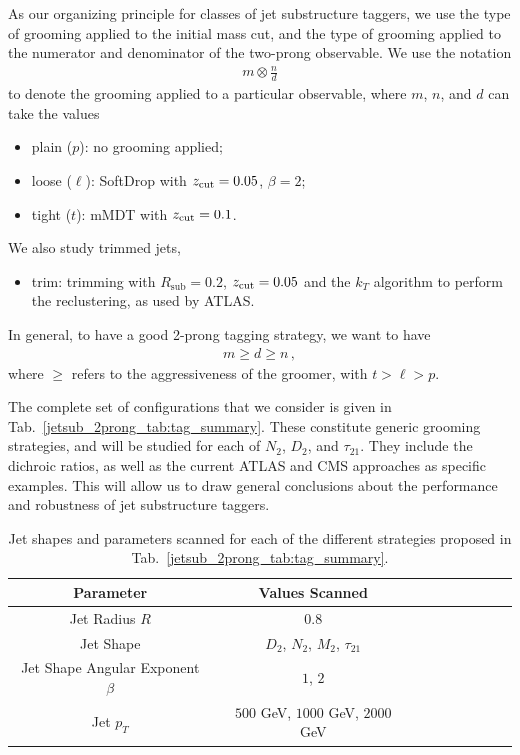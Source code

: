 \documentclass[11pt,letterpaper]{article}
\begin{document}
As our organizing principle for classes of  jet substructure taggers, we use the type of grooming applied to the initial mass cut, and the type of grooming applied to the numerator and denominator of the two-prong observable.
%
We use the notation 
\begin{align}
m \otimes \frac{n}{d}
\end{align}
%
to denote the grooming applied to a particular observable, where $m$, $n$, and $d$ can take the values
%
\begin{itemize}
\item plain ($p$): no grooming applied;
\item loose ($\ell$): SoftDrop with ${z_{\rm cut}}=0.05$, $\beta=2$;
\item tight ($t$): mMDT with ${z_{\rm cut}}=0.1$.
\end{itemize}
%
We also study trimmed jets,
\begin{itemize}
\item trim: trimming with $R_{\text{sub}}=0.2$,  $ {z_{\rm cut}}=0.05$ and the $k_T$ algorithm to perform the reclustering, as used by ATLAS.
\end{itemize}
%
In general, to have a good 2-prong tagging strategy, we want to have
\begin{align}
m \geq d \geq n\,,
\end{align}
%
where $\geq$ refers to the aggressiveness of the groomer, with $t > \ell > p$.

The complete set of configurations that we consider is given in Tab.~\ref{jetsub_2prong_tab:tag_summary}.
%
These constitute generic grooming strategies, and will be studied for each of $N_2$, $D_2$, and $\tau_{21}$.
%
They include the dichroic ratios, as well as the current ATLAS and CMS approaches as specific examples.
%
This will allow us to draw general conclusions about the performance and robustness of jet substructure taggers.


\begin{table}
\begin{center}
\begin{tabular}{| c | c | c |c |c|c|c |c|r| }
  \hline                       
  Parameter &  Values Scanned \\
  \hline
  Jet Radius $R$ &   $0.8$ \\
  Jet Shape  &   $D_2$, $N_2$, $M_2$, $\tau_{21}$  \\
  Jet Shape Angular Exponent $\beta$ &   $1$, $2$ \\
  Jet $p_T$ &   $500$ GeV, $1000$ GeV, $2000$ GeV  \\
  \hline  
\end{tabular}
\end{center}
\caption{
Jet shapes and parameters scanned for each of the different strategies proposed in Tab.~\ref{jetsub_2prong_tab:tag_summary}. 
}
\label{jetsub_2prong_tab:params}
\end{table}
\end{document}
